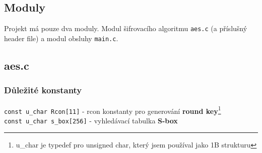 \documentclass[12pt]{article}
\begin{document}
\subsection{Moduly}
Projekt má pouze dva moduly. Modul šifrovacího algoritmu \texttt{aes.c}
(a příslušný header file) a modul obsluhy \texttt{main.c}.
\subsection{aes.c}
\subsubsection{Důležité konstanty}
\noindent\texttt{const u\_char Rcon[11]} - rcon konstanty pro generování
\textbf{round key}\footnote{u\_char je typedef pro unsigned char, který
	jsem používal jako 1B strukturu}\\
\texttt{const u\_char s\_box[256]} - vyhledávací tabulka \textbf{S-box}
\end{document}
